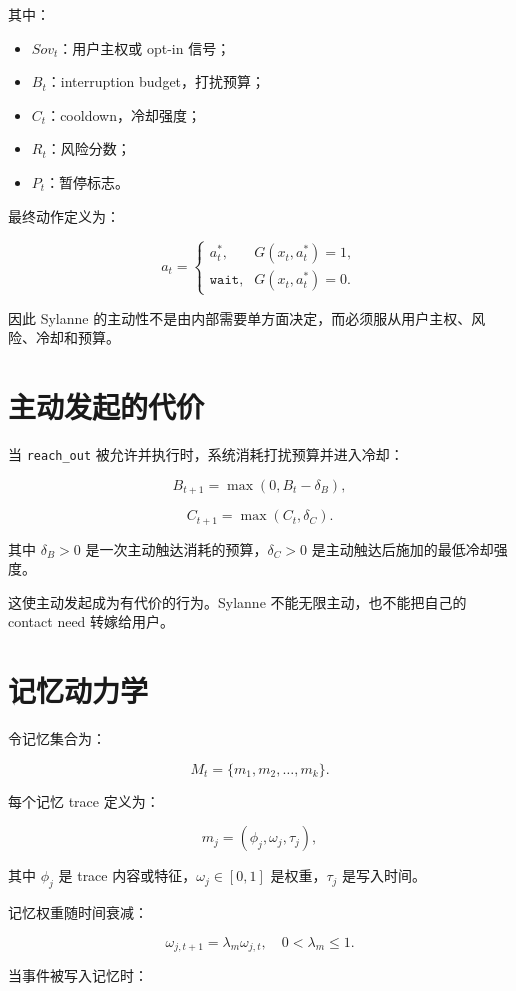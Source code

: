 \documentclass[UTF8,12pt]{ctexart}
\begin{document}
其中：

\begin{itemize}
  \item $Sov_t$：用户主权或 opt-in 信号；
  \item $B_t$：interruption budget，打扰预算；
  \item $C_t$：cooldown，冷却强度；
  \item $R_t$：风险分数；
  \item $P_t$：暂停标志。
\end{itemize}

最终动作定义为：

\[
a_t=
\begin{cases}
a_t^*, & G(x_t,a_t^*)=1,\\
\texttt{wait}, & G(x_t,a_t^*)=0.
\end{cases}
\]

因此 Sylanne 的主动性不是由内部需要单方面决定，而必须服从用户主权、风险、冷却和预算。

\section{主动发起的代价}

当 \texttt{reach\_out} 被允许并执行时，系统消耗打扰预算并进入冷却：

\[
B_{t+1}=\max(0,B_t-\delta_B),
\]

\[
C_{t+1}=\max(C_t,\delta_C).
\]

其中 $\delta_B>0$ 是一次主动触达消耗的预算，$\delta_C>0$ 是主动触达后施加的最低冷却强度。

这使主动发起成为有代价的行为。Sylanne 不能无限主动，也不能把自己的 contact need 转嫁给用户。

\section{记忆动力学}

令记忆集合为：

\[
M_t=\{m_1,m_2,\ldots,m_k\}.
\]

每个记忆 trace 定义为：

\[
m_j=(\phi_j,\omega_j,\tau_j),
\]

其中 $\phi_j$ 是 trace 内容或特征，$\omega_j\in[0,1]$ 是权重，$\tau_j$ 是写入时间。

记忆权重随时间衰减：

\[
\omega_{j,t+1}=\lambda_m\omega_{j,t},\quad 0<\lambda_m\leq1.
\]

当事件被写入记忆时：
\end{document}
